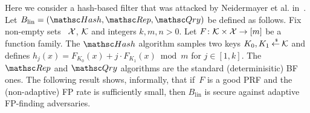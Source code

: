 Here we consider a hash-based filter that was attacked by Neidermayer et al. in~\cite{xxx}.  Let $B_{\mathrm{lin}}=(\Hash,\Rep,\Qry)$ be defined as follows.  Fix non-empty sets ~${\cal X}$, ${\cal K}$ and integers $k,m,n>0$.  Let $F\colon\mathcal{K} \times {\cal X} \to [m]$ be a function family.  The $\Hash$ algorithm samples two keys $K_0,K_1 {\:\stackrel{{\scriptscriptstyle \hspace{0.2em}\$}} {\leftarrow}\:} \mathcal{K}$ and defines $h_j(x) = F_{K_0}(x) + j\cdot F_{K_1}(x) \bmod m$ for $j \in [1,k]$.  The $\Rep$ and $\Qry$ algorithms are the standard (determinisitic) BF ones. The following result shows, informally, that if~$F$ is a good PRF and the (non-adaptive) FP rate is sufficiently small, then $B_\mathrm{lin}$ is secure against adaptive FP-finding adversaries.

